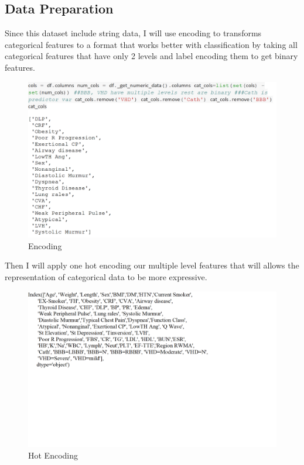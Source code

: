 \documentclass[sigconf]{acmart}
\begin{document}
\subsection{Data Preparation}
Since this dataset include string data, I will use encoding to transforms categorical features to a format that works better with classification by taking all categorical features that have only 2 levels and label encoding them to get binary features. 

\begin{figure}
    \centering
    \includegraphics[width=1.0\columnwidth]{images/Untitled3.png}
    \caption{Encoding}
    \label{Encoding}
\end{figure}

Then I will apply one hot encoding our multiple level features that will allows the representation of categorical data to be more expressive.

\begin{figure}
    \centering
    \includegraphics[width=1.0\columnwidth]{images/Encoding.png}
    \caption{Hot Encoding}
    \label{Hot Enco}
\end{figure}
    
\end{document}
